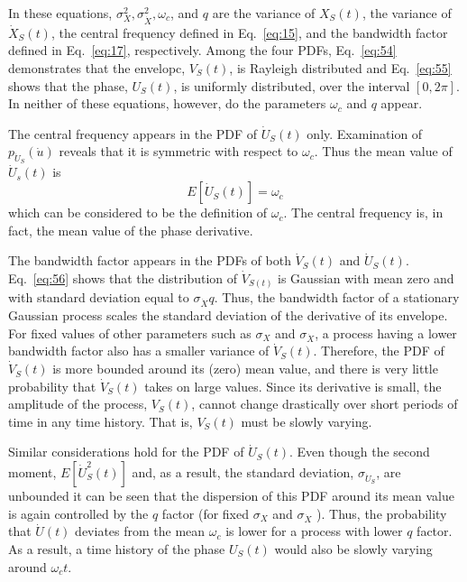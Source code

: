 \documentclass{article}
\begin{document}
In these equations, $\sigma_X^2, \sigma_{\dot{X}}^2, \omega_c$, and $q$ are
the variance of $X_S (t)$, the variance of $\dot{X}_S (t)$, the central
frequency defined in Eq.~\eqref{eq:15}, and the bandwidth factor defined in
Eq.~\eqref{eq:17}, respectively. Among the four PDFs, Eq.~\eqref{eq:54}
demonstrates that the envelopc, $V_S (t)$, is Rayleigh distributed and
Eq.~\eqref{eq:55} shows that the phase, $U_S (t)$, is uniformly distributed,
over the interval $[0, 2 \pi]$. In neither of these equations, however, do the
parameters $\omega_c$ and $q$ appear.

The central frequency appears in the PDF of $\dot{U}_S (t)$ only. Examination
of $p_{\dot{U}_S} (\dot{u})$ reveals that it is symmetric with respect to
$\omega_c$. Thus the mean value of $\dot{U}_s (t)$ is
\begin{equation}
  E [\dot{U}_S (t)] = \omega_c \label{eq:58}
\end{equation}
which can be considered to be the definition of $\omega_c$. The central
frequency is, in fact, the mean value of the phase derivative.

The bandwidth factor appears in the PDFs of both $\dot{V}_S (t)$ and
$\dot{U}_S (t)$. Eq.~\eqref{eq:56} shows that the distribution of $\dot{V}_{S
(t)}$ is Gaussian with mean zero and with standard deviation equal to
$\sigma_{\dot{X}} q$. Thus, the bandwidth factor of a stationary Gaussian
process scales the standard deviation of the derivative of its envelope. For
fixed values of other parameters such as $\sigma_X$ and $\sigma_{\dot{X}}$, a
process having a lower bandwidth factor also has a smaller variance of
$\dot{V}_S (t)$. Therefore, the PDF of $\dot{V}_S (t)$ is more bounded around
its (zero) mean value, and there is very little probability that $\dot{V}_S
(t)$ takes on large values. Since its derivative is small, the amplitude of
the process, $V_S (t)$, cannot change drastically over short periods of time
in any time history. That is, $V_S (t)$ must be slowly varying.

Similar considerations hold for the PDF of $\dot{U}_S (t)$. Even though the
second moment, $E [\dot{U}_S^2 (t)]$ and, as a result, the standard deviation,
$\sigma_{\dot{U}_S}$, are unbounded it can be seen that the dispersion of this
PDF around its mean value is again controlled by the $q$ factor (for fixed
$\sigma_X$ and $\sigma_{\dot{X}}$ ). Thus, the probability that $\dot{U} (t)$
deviates from the mean $\omega_c$ is lower for a process with lower $q$
factor. As a result, a time history of the phase $U_S (t)$ would also be
slowly varying around $\omega_c t$.
\end{document}
